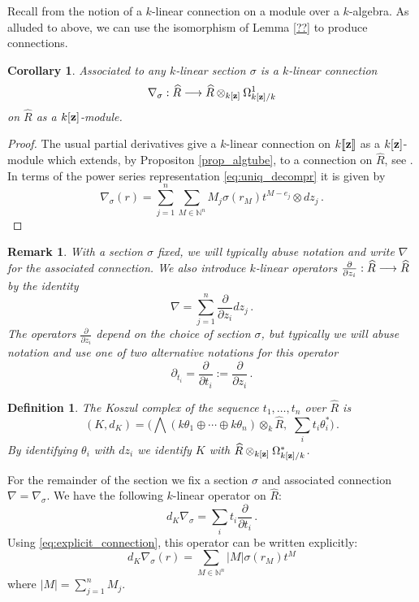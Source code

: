 \documentclass[english,letter paper,12pt,leqno]{article}
\newtheorem{corollary}[theorem]{Corollary}
\theoremstyle{example}
\newtheorem{definition}[theorem]{Definition}
\newtheorem{remark}[theorem]{Remark}
\numberwithin{equation}{section}
\def\be{\begin{equation}}
\def\ee{\end{equation}}
\begin{document}
Recall from \cite{??} the notion of a $k$-linear connection on a module over a $k$-algebra. As alluded to above, we can use the isomorphism of Lemma \ref{??} to produce connections.

\begin{corollary} Associated to any $k$-linear section $\sigma$ is a $k$-linear connection
\be
\nabla_\sigma: \widehat{R} \lto \widehat{R} \otimes_{k[\bold{z}]} \Omega^1_{k[\bold{z}]/k}
\ee
on $\widehat{R}$ as a $k[\bold{z}]$-module.
\end{corollary}
\begin{proof}
The usual partial derivatives give a $k$-linear connection on $k\llbracket \bold{z} \rrbracket$ as a $k[\bold{z}]$-module which extends, by Propositon \ref{prop_algtube}, to a connection on $\widehat{R}$, see \cite{??}. In terms of the power series representation \eqref{eq:uniq_decompr} it is given by
\be\label{eq:explicit_connection}
\nabla_\sigma(r) = \sum_{j=1}^n \sum_{M \in \mathbb{N}^n} M_j \sigma(r_M) t^{M - e_j} \otimes dz_j\,.
\ee
\end{proof}

\begin{remark} With a section $\sigma$ fixed, we will typically abuse notation and write $\nabla$ for the associated connection. We also introduce $k$-linear operators $\frac{\partial}{\partial z_i}: \widehat{R} \longrightarrow \widehat{R}$ by the identity
\[
\nabla = \sum_{j=1}^n \frac{\partial}{\partial z_i} dz_j \,.
\]
The operators $\frac{\partial}{\partial z_i}$ depend on the choice of section $\sigma$, but typically we will abuse notation and use one of two alternative notations for this operator
\[
\partial_{t_i} = \frac{\partial}{\partial t_i} := \frac{\partial}{\partial z_i}\,.
\]
\end{remark}

\begin{definition} The Koszul complex of the sequence $t_1,\ldots,t_n$ over $\widehat{R}$ is
\[
(K, d_K) = \Big( \bigwedge( k \theta_1 \oplus \cdots \oplus k \theta_n ) \otimes_k \widehat{R}, \,\,\sum_i t_i \theta_i^* \Big)\,.
\]
By identifying $\theta_i$ with $dz_i$ we identify $K$ with $\widehat{R} \otimes_{k[\bold{z}]} \Omega^*_{k[\bold{z}]/k}$.
\end{definition}

For the remainder of the section we fix a section $\sigma$ and associated connection $\nabla = \nabla_\sigma$. We have the following $k$-linear operator on $\widehat{R}$:
\[
d_K \nabla_\sigma = \sum_i t_i \frac{\partial}{\partial t_i}\,.
\]
Using \eqref{eq:explicit_connection}, this operator can be written explicitly:
\[
d_K \nabla_\sigma(r) = \sum_{M \in \mathbb{N}^n} |M| \sigma(r_M) t^M
\]
where $|M| = \sum_{j=1}^n M_j$.
\end{document}
